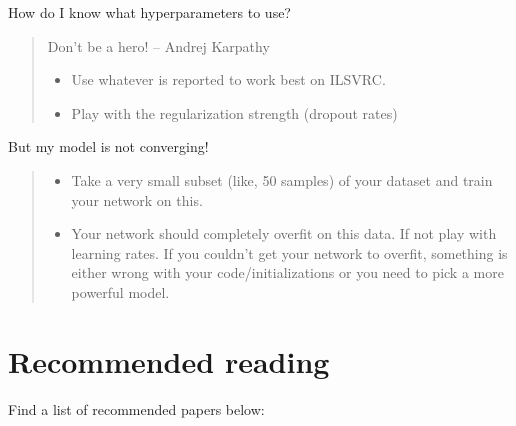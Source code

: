 \documentclass[a4paper]{tufte-handout}
\begin{document}
\noindent How do I know what hyperparameters to use?

\begin{quote}
Don't be a hero! -- Andrej Karpathy

\begin{itemize}
\item
  Use whatever is reported to work best on ILSVRC.
\item
  Play with the regularization strength (dropout rates)
\end{itemize}
\end{quote}

\noindent But my model is not converging!

\begin{quote}
\begin{itemize}
\item
  Take a very small subset (like, 50 samples) of your dataset and train
  your network on this.
\item
  Your network should completely overfit on this data. If not play with
  learning rates. If you couldn't get your network to overfit, something
  is either wrong with your code/initializations or you need to pick a
  more powerful model.
\end{itemize}
\end{quote}

\section{Recommended reading} 

Find a list of recommended papers below:
\end{document}
